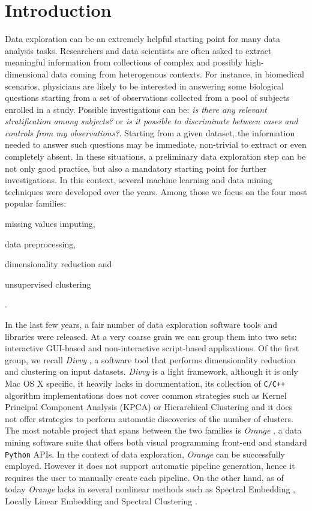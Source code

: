 \documentclass[twoside,11pt]{article}
\makeatletter
\newcommand{\py}{\texttt{Python}\@\xspace}
\makeatother
\begin{document}
\section{Introduction}\label{sec:intro}
Data exploration can be an extremely helpful starting point for many data analysis tasks. Researchers and data scientists are often asked to extract meaningful information from collections of complex and possibly high-dimensional data coming from heterogenous contexts. For instance, in biomedical scenarios, physicians are likely to be interested in answering some biological questions starting from a set of observations collected from a pool of subjects enrolled in a study. Possible investigations can be: \emph{is there any relevant stratification among subjects?} or \emph{is it possible to discriminate between cases and controls from my observations?}. Starting from a given dataset, the information needed to answer such questions may be immediate, non-trivial to extract or even completely absent.
In these situations, a preliminary data exploration step can be not only good practice, but also a mandatory starting point for further investigations. In this context, several machine learning and data mining techniques were developed over the years. Among those we focus on the four most popular families: \begin{enumerate*}[label=(\roman*)]
  \item missing values imputing,
  \item data preprocessing,
  \item dimensionality reduction and
  \item unsupervised clustering
\end{enumerate*}.

In the last few years, a fair number of data exploration software tools and libraries  were released. At a very coarse grain we can group them into two sets: interactive GUI-based and non-interactive script-based  applications. Of the first group, we recall \emph{Divvy} \citep{lewis2013divvy}, a software tool that performs dimensionality reduction and clustering on input datasets. \emph{Divvy} is a light framework, although it is only Mac OS X specific, it heavily lacks in documentation, its collection of \texttt{C/C++} algorithm implementations does not cover common strategies such as Kernel Principal Component Analysis (KPCA) \citep{scholkopf1997kernel} or Hierarchical Clustering \citep{friedman2001elements} and it does not offer strategies to perform automatic discoveries of the number of clusters. The most notable project that spans between the two families is \emph{Orange} \citep{demvsar2013orange}, a data mining software suite that offers both visual programming front-end and standard \py APIs. In the context of data exploration, \emph{Orange} can be successfully employed. However it does not support automatic pipeline generation, hence it requires the user to manually create each pipeline. On the other hand, as of today \emph{Orange} lacks in several nonlinear methods such as Spectral Embedding \citep{ng2002spectral}, Locally Linear Embedding \citep{roweis2000nonlinear} and Spectral Clustering \citep{shi2000normalized}.
\end{document}
